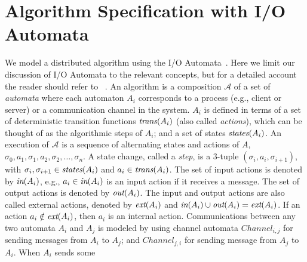 


	\section{Algorithm Specification with I/O Automata}
	\label{subsec:model}
	We model a distributed algorithm using   the I/O Automata~\cite{Lynch1996}.
	Here we limit our discussion of I/O Automata to the relevant concepts, but for a detailed account the reader should refer 
	to ~\cite{Lynch1996}.
	An algorithm is a composition $\mathcal{A}$ of a set of \emph{automata} where each automaton  $A_i$ corresponds to a process (e.g., client or server) or a communication channel in the system.  $A_i$ is defined in terms of
	a set of deterministic transition functions  ${\textit{trans}(A_i)}$ (also called \textit{actions}), which can be thought of as the algorithmic steps of $A_i$;  and  a set of states ${\textit{states}(A_i)}$. 
	An execution of $\mathcal{A}$ is a sequence of alternating states and actions of $A$,  $\sigma_0, a_1, \sigma_1, a_2, \sigma_2, \ldots, \sigma_n$. 
	A state change, called a \textit{step}, is a 3-tuple $(\sigma_i, a_i, \sigma_{i+1})$, with $\sigma_i, \sigma_{i+1} \in {\textit{states}(A_i)}$ and $a_i \in {\textit{trans}(A_i)}$. 
	The set of input actions is denoted by ${\textit{in}(A_i)}$, e.g.,  $a_i \in {\textit{in}(A_i)}$ is an input action if it receives a message. The set of output actions is denoted by ${\textit{out}(A_i)}$. The input and output actions are also called external actions, denoted by ${\textit{ext}(A_i)}$ and ${\textit{in}(A_i)} \cup {\textit{out}(A_i)}={\textit{ext}(A_i)}$. If an action $a_i \notin {\textit{ext}(A_i)}$, then $a_i$ is an internal action.
	Communications between any two automata $A_i$ and $A_j$ is modeled by using channel automata $Channel_{i, j}$ for sending messages from $A_i$ to $A_j$; and $Channel_{j, i}$ for sending message from $A_j$ to $A_i$. When $A_i$ sends some
